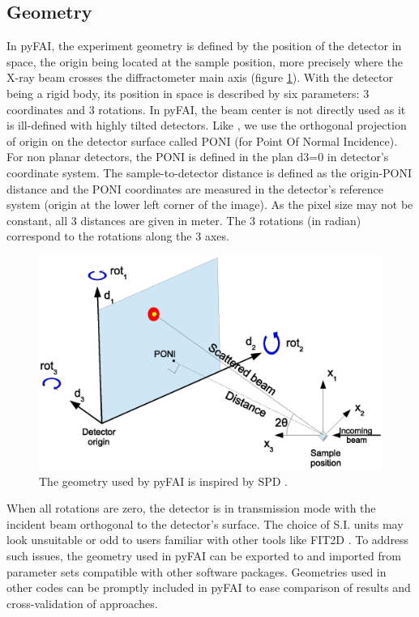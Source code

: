 \documentclass[preprint]{iucr}
\begin{document}
\subsection{Geometry}
In pyFAI, the experiment geometry is defined by the position of the detector in
space, the origin being located at the sample position, more precisely where the
X-ray beam crosses the diffractometer main axis (figure \ref{PONI}).
With the detector being a rigid body, its position in space is described by
six parameters: 3 coordinates and 3 rotations.
In pyFAI, the beam center is not directly used as it is ill-defined with
highly tilted detectors.
Like \cite{spd}, we use the orthogonal projection of origin on
the detector surface called PONI (for Point Of Normal Incidence).
For non planar detectors, the PONI is defined in the plan d3=0 in detector's
coordinate system.
The sample-to-detector distance is defined as the origin-PONI distance
and the PONI coordinates are measured in the detector's reference system
(origin at the lower left corner of the image).
As the pixel size may not be constant, all 3 distances are given in meter.
The 3 rotations (in radian) correspond to the rotations along the 3 axes.

\begin{figure}
\label{PONI}
\begin{center}
\includegraphics[width=15cm]{PONI.eps}
\caption{The geometry used by pyFAI is inspired by SPD \cite{spd}.}
\end{center}
\end{figure}

When all rotations are zero, the detector is in transmission mode with the
incident beam orthogonal to the detector's surface.
The choice of S.I. units may look unsuitable or odd to users familiar
with other tools like FIT2D \cite{fit2d}.
To address such issues, the geometry used in pyFAI can be
exported to and imported from parameter sets compatible with other software
packages.
Geometries used in other codes can be promptly included in pyFAI to ease
comparison of results and cross-validation of approaches.
\end{document}
